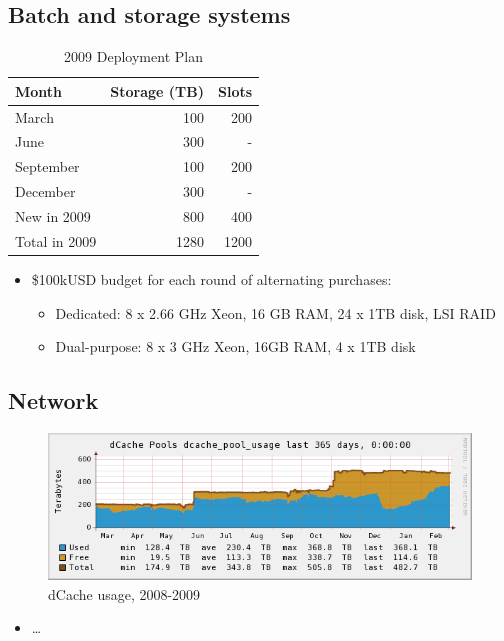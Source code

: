 \documentclass{beamer}
\begin{document}
\subsection{Batch and storage systems}
\begin{frame}
\begin{table}
\begin{tabular}{lrr}
    \toprule
    Month           &   Storage (TB)    &   Slots \\
    \midrule
    March           &   100             &   200 \\
    June            &   300             &   - \\
    September       &   100             &   200 \\
    December        &   300             &   - \\
    \midrule
    New in 2009     &   800             &   400 \\
    Total in 2009   &   1280            &   1200 \\
    \bottomrule
\end{tabular}
\caption{2009 Deployment Plan}
\label{2009_deployment_plan}
\end{table}

\begin{itemize}
    \item \$100kUSD budget for each round of alternating purchases:
    \begin{itemize}
        \item Dedicated: 8 x 2.66 GHz Xeon, 16 GB RAM, 24 x 1TB disk, LSI RAID
        \item Dual-purpose: 8 x 3 GHz Xeon, 16GB RAM, 4 x 1TB disk
    \end{itemize}
\end{itemize}

\end{frame}

\subsection{Network}
\begin{frame}
\begin{figure}
    \includegraphics[width=\textwidth]{Graphics/dcache-usage-1yr.png}
    \caption{dCache usage, 2008-2009}
\end{figure}

\begin{itemize}
    \item \ldots{}
\end{itemize}
\end{frame}
\end{document}
